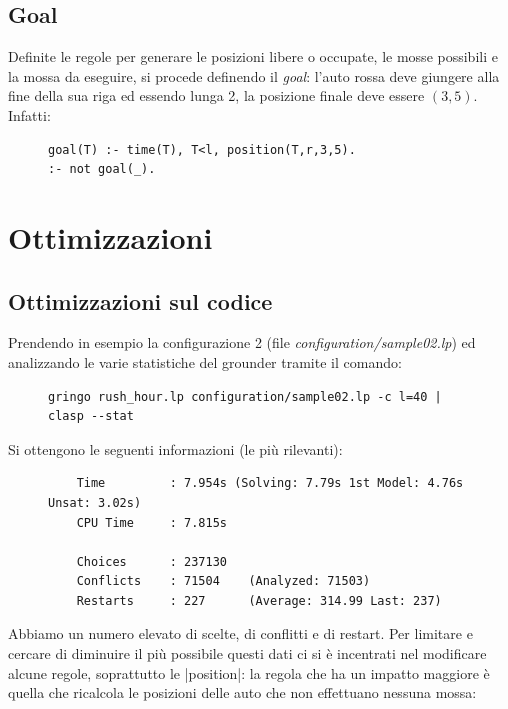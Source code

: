 \documentclass[10pt, a4paper, oneside]{article}
\begin{document}
\subsection{Goal}
Definite le regole per generare le posizioni libere o occupate, le mosse possibili e la mossa da eseguire, si procede definendo il \emph{goal}: l'auto rossa deve giungere alla fine della sua riga ed essendo lunga 2, la posizione finale deve essere $(3,5)$. Infatti:

\begin{figure}[H]
\centering
\begin{verbatim}
goal(T) :- time(T), T<l, position(T,r,3,5).
:- not goal(_).
\end{verbatim}
\end{figure}









\newpage
\section{Ottimizzazioni}

\subsection{Ottimizzazioni sul codice}
Prendendo in esempio la configurazione 2 (file \emph{configuration/sample02.lp}) ed analizzando le varie statistiche del grounder tramite il comando:
\begin{figure}[H]
\centering
\begin{verbatim}
gringo rush_hour.lp configuration/sample02.lp -c l=40 | clasp --stat
\end{verbatim}
\end{figure}

\noindent
Si ottengono le seguenti informazioni (le più rilevanti):
\begin{figure}[H]
\centering
\begin{verbatim}
    Time         : 7.954s (Solving: 7.79s 1st Model: 4.76s Unsat: 3.02s)
    CPU Time     : 7.815s

    Choices      : 237130  
    Conflicts    : 71504    (Analyzed: 71503)
    Restarts     : 227      (Average: 314.99 Last: 237)
\end{verbatim}
\end{figure}

\noindent
Abbiamo un numero elevato di scelte, di conflitti e di restart. Per limitare e cercare di diminuire il più possibile questi dati ci si è incentrati nel modificare alcune regole, soprattutto le |position|: la regola che ha un impatto maggiore è quella che ricalcola le posizioni delle auto che non effettuano nessuna mossa:
\end{document}
